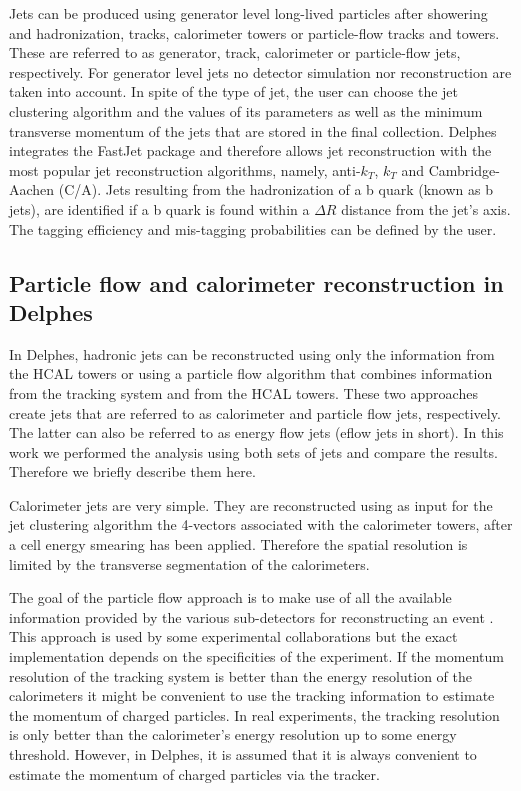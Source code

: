 Jets can be produced using generator level long-lived particles after showering and hadronization, tracks, calorimeter towers or particle-flow tracks and towers. These are referred to as generator, track, calorimeter or particle-flow jets, respectively. For generator level jets no detector simulation nor reconstruction are taken into account. In spite of the type of jet, the user can choose the jet clustering algorithm and the values of its parameters as well as the minimum transverse momentum of the jets that are stored in the final collection. Delphes integrates the FastJet package \cite{fastjet} and therefore allows jet reconstruction with the most popular jet reconstruction algorithms, namely, anti-$k_T$, $k_T$ and Cambridge-Aachen (C/A). 
Jets resulting from the hadronization of a b quark (known as b jets), are identified if a b quark is found within a $\Delta R$ distance from the jet's axis. The tagging efficiency and mis-tagging probabilities can be defined by the user. 

\subsection{Particle flow and calorimeter reconstruction in Delphes}

In Delphes, hadronic jets can be reconstructed using only the information from the HCAL towers or using a particle flow algorithm that combines information from the tracking system and from the HCAL towers. These two approaches create jets that are referred to as calorimeter and particle flow jets, respectively. The latter can also be referred to as energy flow jets (eflow jets in short). In this work we performed the analysis using both sets of jets and compare the results. Therefore we briefly describe them here.

Calorimeter jets are very simple. They are reconstructed using as input for the jet clustering algorithm the 4-vectors associated with the calorimeter towers, after a cell energy smearing has been applied. Therefore the spatial resolution is limited by the transverse segmentation of the calorimeters.

The goal of the particle flow approach is to make use of all the available information provided by the various sub-detectors for reconstructing an event \cite{Delphes}. This approach is used by some experimental collaborations \cite{PF1,PF2} but the exact implementation depends on the specificities of the experiment. If the momentum resolution of the tracking system is better than the energy resolution of the calorimeters it might be convenient to use the tracking information to estimate the momentum of charged particles. In real experiments, the tracking resolution is only better than the calorimeter's energy resolution up to some energy threshold. However, in Delphes, it is assumed that it is always convenient to estimate the momentum of charged particles via the tracker. 

